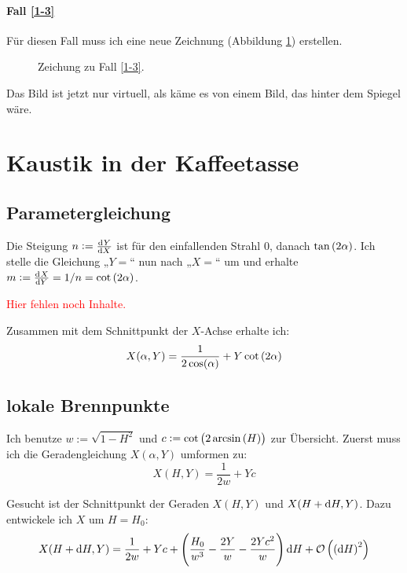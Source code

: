 \documentclass[11pt, ngerman, fleqn]{article}
\newcommand{\fehlt}{\textcolor{red}{Hier fehlen noch Inhalte.}}
\begin{document}
\paragraph{Fall \ref{1-3}}

Für diesen Fall muss ich eine neue Zeichnung (Abbildung \ref{fig:3}) erstellen.

{
	\begin{figure}
		\centering
		\caption{Zeichung zu Fall \ref{1-3}.}
		\label{fig:3}
	\end{figure}
}

Das Bild ist jetzt nur virtuell, als käme es von einem Bild, das hinter dem
Spiegel wäre.


\section{Kaustik in der Kaffeetasse}
\label{2}

\subsection{Parametergleichung}

Die Steigung $n := \od YX$ ist für den einfallenden Strahl $0$, danach
$\tan\del{2\alpha}$. Ich stelle die Gleichung „$Y=$“ nun nach „$X=$“ um und
erhalte $m := \od XY = 1/n = \cot\del{2\alpha}$.

\fehlt

Zusammen mit dem Schnittpunkt der $X$-Achse erhalte ich:
\[
	X(\alpha, Y) = \frac{1}{2 \cos(\alpha)} + Y \cot\del{2\alpha}
\]

\subsection{lokale Brennpunkte}

Ich benutze $w := \sqrt{1-H^2}$ und $c := \cot\del{2 \arcsin\del H}$ zur
Übersicht. Zuerst muss ich die Geradengleichung $X(\alpha, Y)$ umformen zu:
\[
	X(H, Y) = \frac{1}{2w} + Y c
\]

Gesucht ist der Schnittpunkt der Geraden $X(H, Y)$ und $X(H + \dif H, Y)$. Dazu
entwickele ich $X$ um $H = H_0$:
\[
	X(H + \dif H, Y) = \frac{1}{2w} + Y c + \del{\frac{H_0}{w^3} - \frac{2Y}{w} - \frac{2Y c^2}{w}} \dif H + \mathcal O\del{\del{\dif H}^2}
\]
\end{document}
